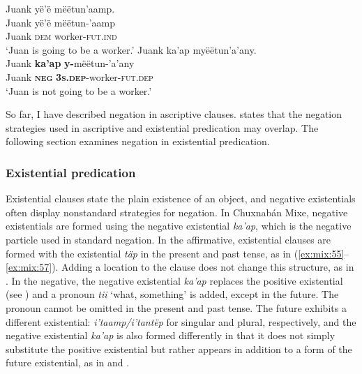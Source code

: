 \documentclass[output=paper,colorlinks,citecolor=brown,draft]{langscibook}
\begin{document}
\ea\label{ex:mix:54}
    \ea\label{ex:mix:54a}
        \glll Juank yë’ë mëëtun’aamp.\\ 
              Juank yë’ë mëëtun-’aamp\\
              Juank \textsc{dem} worker-\textsc{fut.ind}\\
        \glt ‘Juan is going to be a worker.’
    \ex\label{ex:mix:54b}
        \glll Juank ka’ap myëëtun’a’any.\\
              Juank \textbf{ka’ap} \textbf{y-}mëëtun-’a’any\\
              Juank \textbf{\textsc{neg}} \textbf{\textsc{3s.dep}}{}-worker-\textsc{fut.dep}\\
        \glt ‘Juan is not going to be a worker.’
    \z
\z 

So far, I have described negation in ascriptive clauses. \citet{Veselinova2013neg.exist} states that the negation strategies used in ascriptive and existential predication may overlap. The following section examines negation in existential predication.

\subsubsection{Existential predication}\label{sec:mix:2.3.4}

Existential clauses state the plain existence of an object, and negative existentials often display nonstandard strategies for negation. In Chuxnabán Mixe, negative existentials are formed using the negative existential \textit{ka’ap}, which is the negative particle used in standard negation. In the affirmative, existential clauses are formed with the existential \textit{täp} in the present and past tense, as in (\ref{ex:mix:55}--\ref{ex:mix:57}). Adding a location to the clause does not change this structure, as in . In the negative, the negative existential \textit{ka’ap} replaces the positive existential (see \citealt{Veselinova2013neg.exist,Veselinova2016}) and a pronoun \textit{tii} ‘what, something’ is added, except in the future. The pronoun cannot be omitted in the present and past tense. The future exhibits a different existential: \textit{i’taamp/i’tantëp} for singular and plural, respectively, and the negative existential \textit{ka’ap} is also formed differently in that it does not simply substitute the positive existential but rather appears in addition to a form of the future existential, as in  and .
\end{document}
